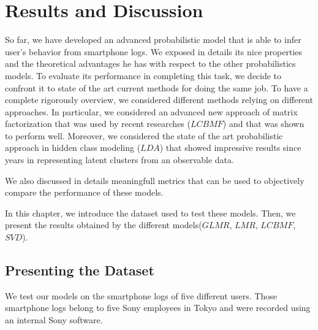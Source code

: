 
\chapter{Results and Discussion} %

\label{Chapter6} %


So far, we have developed an advanced probabilistic model that is able to infer user's behavior from smartphone logs. We exposed in details its nice properties and the theoretical advantages he has with respect to the other probabilistics models. To evaluate its performance in completing this task, we decide to confront it to state of the art current methods for doing the same job. To have a complete rigorously overview, we considered different methods relying on different approaches. In particular, we considered an advanced new approach of matrix factorization that was used by recent researches ($LCBMF$) and that was shown to perform well. Moreover, we considered the state of the art probabilistic approach in hidden class modeling ($LDA$) that showed impressive results since years in representing latent clusters from an observable data.

\noindent
We also discussed in details meaningfull metrics that can be used to objectively compare the performance of these models.

In this chapter, we introduce the dataset used to test these models. Then, we present the results obtained by the different models($GLMR$, $LMR$, $LCBMF$, $SVD$).


\section{Presenting the Dataset}

We test our models on the smartphone logs of five different users. Those smartphone logs belong to five Sony employees in Tokyo and were recorded using an internal Sony software.

